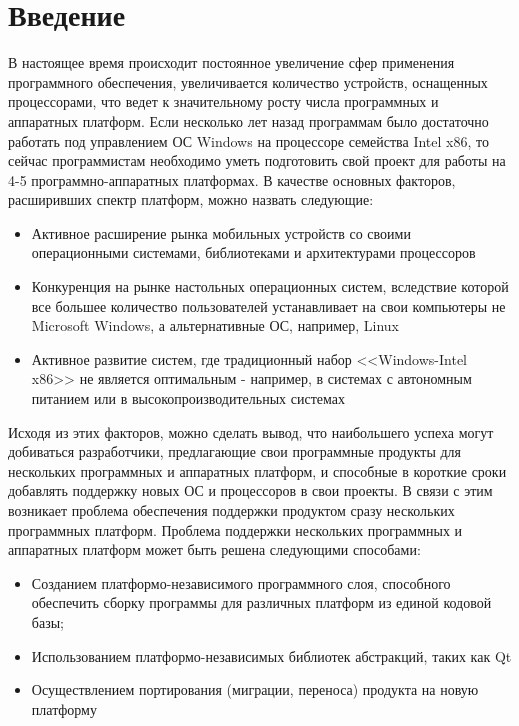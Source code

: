 \setcounter{page}{2}
\tableofcontents
\newpage

\section*{Введение}
В настоящее время происходит постоянное увеличение сфер применения программного обеспечения, увеличивается количество устройств, оснащенных процессорами, что ведет к значительному росту числа программных и аппаратных платформ. Если несколько лет назад программам было достаточно работать под управлением ОС Windows на процессоре семейства Intel x86, то сейчас программистам необходимо уметь подготовить свой проект для работы на 4-5 программно-аппаратных платформах. В качестве основных факторов, расширивших спектр платформ, можно назвать следующие:

\begin{itemize}
\item Активное расширение рынка мобильных устройств со своими операционными системами, библиотеками и архитектурами процессоров
\item Конкуренция на рынке настольных операционных систем, вследствие которой все большее количество пользователей устанавливает на свои компьютеры не Microsoft Windows, а альтернативные ОС, например, Linux
\item Активное развитие систем, где традиционный набор <<Windows-Intel x86>> не является оптимальным - например, в системах с автономным питанием или в высокопроизводительных системах
\end{itemize}

Исходя из этих факторов, можно сделать вывод, что наибольшего успеха могут добиваться разработчики, предлагающие свои программные продукты для нескольких программных и аппаратных платформ, и способные в короткие сроки добавлять поддержку новых ОС и процессоров в свои проекты. В связи с этим возникает проблема обеспечения поддержки продуктом сразу нескольких программных платформ.
Проблема поддержки нескольких программных и аппаратных платформ может быть решена следующими способами:
\begin{itemize}
	\item Созданием платформо-независимого программного слоя, способного обеспечить сборку программы для различных платформ из единой кодовой базы;
	\item Использованием платформо-независимых библиотек абстракций, таких как Qt
	\item Осуществлением портирования (миграции, переноса) продукта на новую платформу
\end{itemize}

